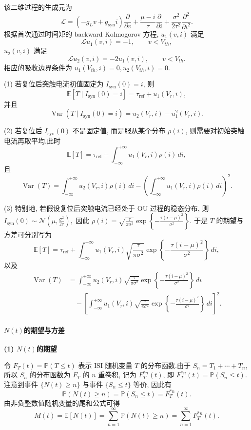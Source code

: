 ﻿\documentclass[UTF8,  zihao=-4]{ctexart}
\begin{document}
该二维过程的生成元为
\[
\mathcal{L}
=
\left(-g_Lv+g_{\mathrm{syn}}i\right)\frac{\partial}{\partial v}
+
\frac{\mu-i}{\tau}\frac{\partial}{\partial i}
+
\frac{\sigma^2}{2\tau^2}\frac{\partial^2}{\partial i^2}.
\]
根据首次通过时间矩的 backward Kolmogorov 方程, \(u_1(v,  i)\)
满足
\[
\mathcal{L}u_1(v,  i)=-1, 
\qquad v<V_{th}, 
\]
\(u_2(v,  i)\) 满足
\[
\mathcal{L}u_2(v,  i)=-2u_1(v,  i), 
\qquad v<V_{th}.
\]
相应的吸收边界条件为
$
u_1(V_{th},  i)=0, 
u_2(V_{th},  i)=0.
$

(1) 若复位后突触电流初值固定为 \(I_{\mathrm{syn}}(0)=i\), 则
\[
\mathbb{E}[T\mid I_{\mathrm{syn}}(0)=i]
=
\tau_{\mathrm{ref}}+u_1(V_r,  i), 
\]
并且
\[
\operatorname{Var}(T\mid I_{\mathrm{syn}}(0)=i)
=
u_2(V_r,  i)-u_1^2(V_r,  i).
\]

(2) 若复位后 \(I_{\mathrm{syn}}(0)\) 不是固定值, 而是服从某个分布
\(\rho(i)\), 则需要对初始突触电流再取平均.此时
\[
\mathbb{E}[T]
=
\tau_{\mathrm{ref}}
+
\int_{-\infty}^{+\infty}u_1(V_r,  i)\rho(i)\,  di, 
\]
且
\[
\operatorname{Var}(T)
=
\int_{-\infty}^{+\infty}u_2(V_r,  i)\rho(i)\,  di
-
\left(
\int_{-\infty}^{+\infty}u_1(V_r,  i)\rho(i)\,  di
\right)^2.
\]

(3) 特别地, 若假设复位后突触电流已经处于 OU 过程的稳态分布, 则
$
I_{\mathrm{syn}}(0)
\sim
\mathcal{N}
\left(
\mu, \frac{\sigma^2}{2\tau}
\right), 
$
因此
$
\rho(i)
=
\sqrt{\frac{\tau}{\pi\sigma^2}}
\exp\left\{
-\frac{\tau(i-\mu)^2}{\sigma^2}
\right\}.
$
于是 \(T\) 的期望与方差可分别写为
\[
\mathbb{E}[T]
=
\tau_{\mathrm{ref}}
+
\int_{-\infty}^{+\infty}u_1(V_r,  i)
\sqrt{\frac{\tau}{\pi\sigma^2}}
\exp\left\{
-\frac{\tau(i-\mu)^2}{\sigma^2}
\right\}
\,  di, 
\]
以及
\[
\begin{aligned}
\operatorname{Var}(T)
&=
\int_{-\infty}^{+\infty}u_2(V_r,  i)
\sqrt{\frac{\tau}{\pi\sigma^2}}
\exp\left\{
-\frac{\tau(i-\mu)^2}{\sigma^2}
\right\}
\,  di
\\
&\quad
-
\left[
\int_{-\infty}^{+\infty}u_1(V_r,  i)
\sqrt{\frac{\tau}{\pi\sigma^2}}
\exp\left\{
-\frac{\tau(i-\mu)^2}{\sigma^2}
\right\}
\,  di
\right]^2.
\end{aligned}
\]


\paragraph{\texorpdfstring{\(N(t)\)的期望与方差}{N(t) 的期望与方差}}
\textbf{(1) \(N(t)\)的期望}

令 \(F_T(t)=\mathbb{P}(T\leq t)\) 表示 ISI 随机变量 \(T\) 的分布函数.由于 \(S_n=T_1+\cdots+T_n\), 所以 \(S_n\) 的分布函数为 \(F_T\) 的 \(n\) 重卷积, 记为 \(F_T^{*n}(t)\), 即
$
F_T^{*n}(t)=\mathbb{P}(S_n\leq t).
$
注意到事件 \(\{N(t)\geq n\}\) 与事件 \(\{S_n\leq t\}\) 等价, 因此有
\[
\mathbb{P}(N(t)\geq n)=\mathbb{P}(S_n\leq t)=F_T^{*n}(t).
\]
由非负整数值随机变量的尾和公式可得
\[
M(t)=\mathbb{E}[N(t)]
=
\sum_{n=1}^{\infty}\mathbb{P}(N(t)\geq n)
=
\sum_{n=1}^{\infty}F_T^{*n}(t).
\]
\end{document}
